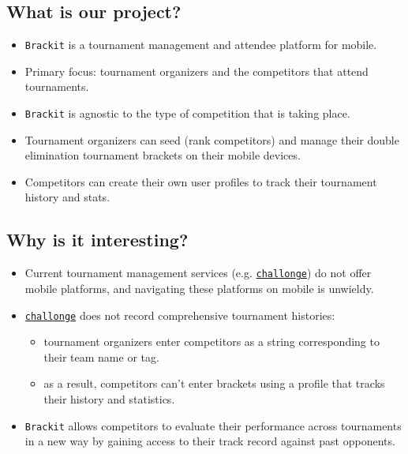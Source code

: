 \documentclass{article}
\begin{document}
\subsection*{What is our project?}
\begin{itemize}
    \item{\texttt{Brackit} is a tournament management and attendee platform for mobile.}
    \item{Primary focus: tournament organizers and the competitors that attend tournaments.}
    \item{\texttt{Brackit} is agnostic to the type of competition that is taking place.}
    \item{Tournament organizers can seed (rank competitors) and manage their double elimination tournament brackets on their mobile devices.}
    \item{Competitors can create their own user profiles to track their tournament history and stats. }
\end{itemize}
\subsection*{Why is it interesting?}

\begin{itemize}
    \item{Current tournament management services (e.g. \href{https://challonge.com/}{\texttt{challonge}}) do not offer mobile platforms, and navigating these platforms on mobile is unwieldy.}
    \item{\href{https://challonge.com/}{\texttt{challonge}} does not record comprehensive tournament histories:}
    \begin{itemize}
        \item{tournament organizers enter competitors as a string corresponding to their team name or tag.}
        \item{as a result, competitors can't enter brackets using a profile that tracks their history and statistics.}
    \end{itemize}
    \item{\texttt{Brackit} allows competitors to evaluate their performance across tournaments in a new way by gaining access to their track record against past opponents.}
    
\end{itemize}
\end{document}
